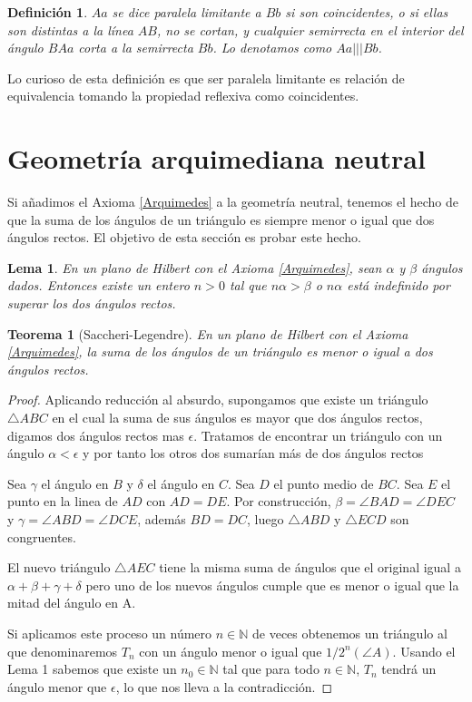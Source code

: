 \documentclass[a4paper]{amsart}
\theoremstyle{plain}
\newtheorem{theorem}{Teorema}
\newtheorem{definition}{Definición}
\newtheorem{lemma}{Lema}
\begin{document}
\begin{definition}
$Aa$ se dice paralela limitante a $Bb$ si son coincidentes, o si ellas son distintas a la línea $AB$, no se cortan, y cualquier semirrecta en el interior del ángulo $BAa$ corta a la semirrecta $Bb$. Lo denotamos como $Aa|||Bb$.
\end{definition}

Lo curioso de esta definición es que ser paralela limitante es relación de equivalencia tomando la propiedad reflexiva como coincidentes.

\section{Geometría arquimediana neutral}

Si añadimos el Axioma \ref{Arquimedes} a la geometría neutral, tenemos el hecho de que la suma de los ángulos de un triángulo es siempre menor o igual que dos ángulos rectos. El objetivo de esta sección es probar este hecho.

\begin{lemma}
En un plano de Hilbert con el Axioma \ref{Arquimedes}, sean $\alpha$ y $\beta$ ángulos dados. Entonces existe un entero $n>0$ tal que $n\alpha>\beta$ o $n\alpha$ está indefinido por superar los dos ángulos rectos.
\end{lemma}

\begin{theorem}[Saccheri-Legendre]
En un plano de Hilbert con el Axioma \ref{Arquimedes}, la suma de los ángulos de un triángulo es menor o igual a dos ángulos rectos.
\end{theorem}

\begin{proof}
Aplicando reducción al absurdo, supongamos que existe un triángulo $\triangle ABC$ en el cual la suma de sus ángulos es mayor que dos ángulos rectos, digamos dos ángulos rectos mas $\epsilon$. Tratamos de encontrar un triángulo con un ángulo $\alpha<\epsilon$ y por tanto los otros dos sumarían más de dos ángulos rectos

Sea $\gamma$ el ángulo en $B$ y $\delta$ el ángulo en $C$. Sea $D$ el punto medio de $BC$. Sea $E$ el punto en la linea de $AD$ con $AD=DE$. Por construcción, $\beta=\angle BAD=\angle DEC$ y $\gamma=\angle ABD=\angle DCE$, además $BD=DC$, luego $\triangle ABD$ y $\triangle ECD$ son congruentes.

El nuevo triángulo $\triangle AEC$ tiene la misma suma de ángulos que el original igual a $\alpha+\beta+\gamma+\delta$ pero uno de los nuevos ángulos cumple que es menor o igual que la mitad del ángulo en A.

Si aplicamos este proceso un número $n\in \mathbb{N}$ de veces obtenemos un triángulo al que denominaremos $T_n$ con un ángulo menor o igual que $1/2^n(\angle A)$. Usando el Lema 1 sabemos que existe un $n_0\in \mathbb{N}$ tal que para todo $n\in \mathbb{N}$, $T_n$ tendrá un ángulo menor que $\epsilon$, lo que nos lleva a la contradicción.
\end{proof}
\end{document}
